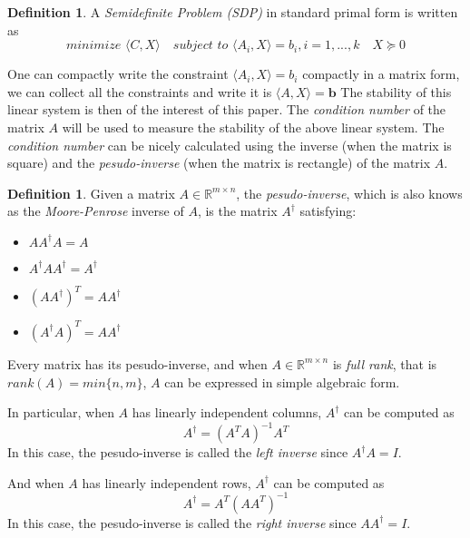 \documentclass[12pt]{amsart}
\numberwithin{equation}{section}
\theoremstyle{definition}
\newtheorem{definition}[thm]{Definition}
\numberwithin{thm}{section}
\begin{document}
\begin{definition}
     \label{def:SDP}
     A \emph{Semidefinite Problem (SDP)} in standard primal form is written as
     \begin{equation}
          \textit{minimize } \langle C, X \rangle \quad \textit{subject to } \langle A_i, X \rangle = b_i, i=1,...,k \quad X \succcurlyeq 0 \label{eq:2.3}
     \end{equation}
\end{definition}

\smallskip

One can compactly write the constraint $\langle A_i, X \rangle = b_i$ compactly in a matrix form, we can collect all the constraints and write it is $ \langle A, X \rangle = \mathbf{b}$ 
The stability of this linear system is then of the interest of this paper. 
The \emph{condition number} of the matrix $A$ will be used to measure the stability of the above linear system. 
The \emph{condition number} can be nicely calculated using the inverse (when the matrix is square) and the \emph{pesudo-inverse} (when the matrix is rectangle) of the matrix $A$.

\begin{definition}
     Given a matrix $A \in \mathbb{R}^{m \times n}$, the \emph{pesudo-inverse},
     which is also knows as the \emph{Moore-Penrose} inverse of $A$, is the matrix
     $A^\dagger$ satisfying:
     \begin{itemize}
          \item $A A^\dagger A = A$
          \item $A^\dagger A A^\dagger = A^\dagger$
          \item $(A A^\dagger)^T = A A^\dagger$
          \item $(A^\dagger A)^T = A A^\dagger$
        \end{itemize}
\end{definition}

Every matrix has its pesudo-inverse, and when $A \in \mathbb{R}^{m \times n}$ is \emph{full rank}, 
that is $rank(A) = min\{n, m\}$, $A$ can be expressed in simple algebraic form.

In particular, when $A$ has linearly independent columns, $A^\dagger$ can be computed as
\begin{equation*}
     A^\dagger = (A^T A)^{-1} A^T
\end{equation*}
In this case, the pesudo-inverse is called the \emph{left inverse} since $A^\dagger A = I$.

\smallskip
And when $A$ has linearly independent rows, $A^\dagger$ can be computed as
\begin{equation*}
     A^\dagger = A^T (A A^T)^{-1}
\end{equation*}
In this case, the pesudo-inverse is called the \emph{right inverse} since $A A^\dagger = I$. 
\end{document}
